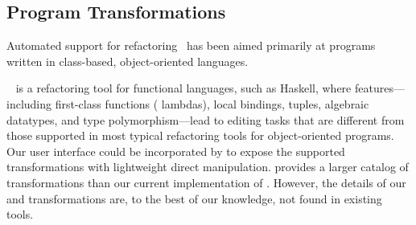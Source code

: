 


\subsection{Program Transformations}


Automated support for
refactoring~\cite{GriswoldThesis,Fowler1999,SmalltalkRefactoring} has been aimed
primarily at programs written in class-based, object-oriented languages.




\hare{}~\cite{Thompson2013,HaReThesis1,HaReThesis2}
is a refactoring tool for functional languages, such as Haskell,
where features---including first-class functions
(\ie{} lambdas), local bindings, tuples, algebraic datatypes, and type
polymorphism---lead to editing tasks that are different from those
supported in most typical refactoring tools for object-oriented programs.
Our user interface could be incorporated by \hare{} to expose the
supported transformations with lightweight direct manipulation.
\hare{} provides a larger catalog of transformations than our
current implementation of \deuce{}. However, the details of our  and  transformations are, to the best of our
knowledge, not found in existing tools.

